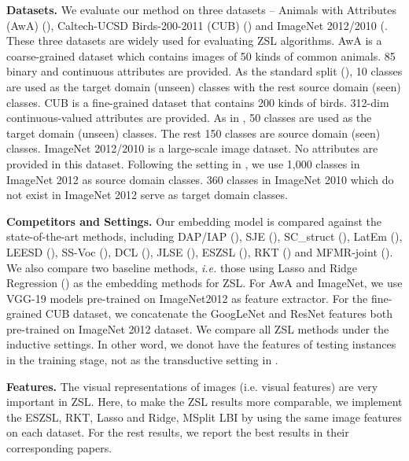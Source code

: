 \documentclass{article}
\begin{document}
\noindent \textbf{Datasets.} We evaluate our method on three datasets
– Animals with Attributes (AwA) (\citet{lampert13AwAPAMI}), Caltech-UCSD
Birds-200-2011 (CUB) (\citet{WahCUB_200_2011}) and ImageNet 2012/2010
(\citet{deng2009imagenet}. These three datasets are widely used for
evaluating ZSL algorithms. AwA is a coarse-grained dataset which contains
images of 50 kinds of common animals. 85 binary and continuous attributes
are provided. As the standard split (\citet{lampert13AwAPAMI}), 10
classes are used as the target domain (unseen) classes with the rest
source domain (seen) classes. CUB is a fine-grained dataset that contains
200 kinds of birds. 312-dim continuous-valued attributes are provided.
As in \citet{akata2013label}, 50 classes are used as the target domain
(unseen) classes. The rest 150 classes are source domain (seen) classes.
ImageNet 2012/2010 is a large-scale image dataset. No attributes are
provided in this dataset. Following the setting in \citet{fu2016semi},
we use 1,000 classes in ImageNet 2012 as source domain classes.
360 classes in ImageNet 2010 which do not exist in ImageNet 2012 serve
as target domain classes.


\noindent \textbf{Competitors and Settings.} Our embedding model is
compared against the state-of-the-art methods, including DAP/IAP (\citet{lampert2014attribute}),
SJE (\citet{akata2015evaluation}), SC\_struct (\citet{changpinyo2016synthesized}),
LatEm (\citet{xian2016latent}), LEESD (\citet{dinglow}), SS-Voc
(\citet{fu2016semi}), DCL (\citet{guo2017zero}), JLSE (\citet{zhang2016zero}),
ESZSL (\citet{romera2015embarrassingly}), RKT (\citet{wang2016relational})
and MFMR-joint (\citet{xu2017matrix}). We also compare two baseline
methods, \emph{i.e.} those using Lasso and Ridge Regression (\citet{palatucci2009zero})
as the embedding methods for ZSL. For AwA and ImageNet, we use VGG-19
models pre-trained on ImageNet2012 as feature extractor. For the fine-grained
CUB dataset, we concatenate the GoogLeNet and ResNet features both
pre-trained on ImageNet 2012 dataset. We compare all ZSL methods under
the inductive settings. In other word, we donot have the features
of testing instances in the training stage, not as the transductive
setting in \citet{fu2015transductive}.




\noindent \textbf{Features.} The visual representations of images
(i.e. visual features) are very important in ZSL. Here, to make
the ZSL results more comparable, we implement the ESZSL, RKT, Lasso
and Ridge,  {MSplit} LBI by using the same image features on each
dataset. For the rest results,
we report the best results in their corresponding papers.
\end{document}
